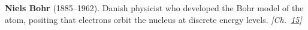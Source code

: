 \nobelphysics \textbf{Niels Bohr} (1885–1962). Danish physicist who developed the Bohr model of the atom, positing that electrons orbit the nucleus at discrete energy levels. \emph{[Ch.~\hyperref[ch:envelopeparadox]{15}]}

